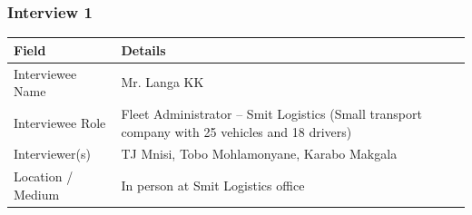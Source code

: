 \documentclass[11pt,a4paper]{article}
\begin{document}
\subsubsection*{Interview 1}
\begin{longtable}{@{}p{3.2cm}p{11.3cm}@{}}
\toprule
Field & Details \\
\midrule
\endhead
Interviewee Name & Mr. Langa KK \\
Interviewee Role & Fleet Administrator -- Smit Logistics (Small transport company with 25 vehicles and 18 drivers) \\
Interviewer(s) & TJ Mnisi, Tobo Mohlamonyane, Karabo Makgala \\
Location / Medium & In person at Smit Logistics office \\
\bottomrule
\end{longtable}
\end{document}
